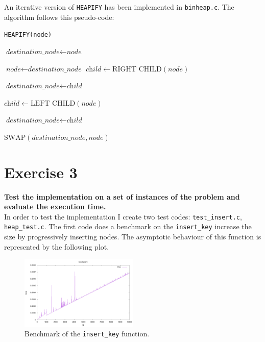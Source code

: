 \documentclass{article}
\begin{document}
	\noindent An iterative version of \texttt{HEAPIFY} has been implemented in \texttt{binheap.c}. The algorithm follows this pseudo-code:
	\newpage
	\begin{algorithm}
		\caption{\texttt{HEAPIFY(node)}}\label{euclid}
	\begin{algorithmic}
		\State $\textit{destination\_node} \gets \textit{node}$
		\Do
		
		\State $\textit{node} \gets \textit{destination\_node}$
		\State $\textit{child} \gets \text{RIGHT CHILD}(\textit{node})$
		
		\State $\textit{destination\_node} \gets \textit{child}$
		\EndIf
		
		\State $\textit{child} \gets \text{LEFT CHILD}(\textit{node})$
		
		\State $\textit{destination\_node} \gets \textit{child}$
		\EndIf
		
		\State $\text{SWAP}(\textit{destination\_node}, \textit{node})$
		\EndIf
		
	\end{algorithmic}
	\end{algorithm}
	
	\section*{Exercise 3}
	\textbf{Test the implementation on a set of instances of the problem and evaluate the execution time.} \\
	
	\noindent In order to test the implementation I create two test codes: \texttt{test\_insert.c}, \texttt{heap\_test.c}. The first code does a benchmark on the \texttt{insert\_key} increase the size by progressively inserting nodes. The asymptotic behaviour of this function is represented by the following plot.
	
	\begin{figure}[h]
		\centering
		\includegraphics[width=0.5\textwidth]{plot_benchmark.png}  
		\caption{Benchmark of the \texttt{insert\_key} function.}
		\label{plot}
	\end{figure}
	
\end{document}
